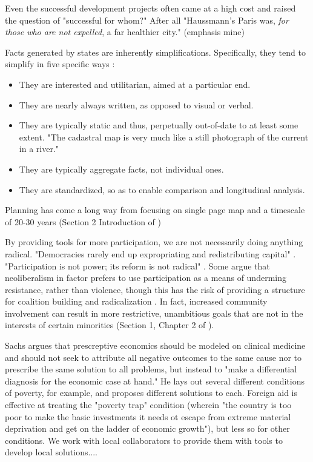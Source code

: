 Even the successful development projects often came at a high cost and raised the question of "successful for whom?" After all "Haussmann's Paris was, \textit{for those who are not expelled}, a far healthier city." (emphasis mine) \cite{scottSeeingStateHow2020}


Facts generated by states are inherently simplifications. Specifically, they tend to simplify in five specific ways \cite{scottSeeingStateHow2020}:

\begin{itemize} \setlength{\itemsep}{0pt} \setlength{\parskip}{0pt} 
	\item{They are interested and utilitarian, aimed at a particular end.}
	\item{They are nearly always written, as opposed to visual or verbal.}
	\item{They are typically static and thus, perpetually out-of-date to at least some extent. "The cadastral map is very much like a still photograph of the current in a river."}
	\item{They are typically aggregate facts, not individual ones.}
	\item{They are standardized, so as to enable comparison and longitudinal analysis.}
\end{itemize}


Planning has come a long way from focusing on single page map and a timescale of 20-30 years (Section 2 Introduction of \cite{robinsonDecisionmakingUrbanPlanning1972})

By providing tools for more participation, we are not necessarily doing anything radical. "Democracies rarely end up expropriating and redistributing capital" \cite{fainsteinSpatialJusticePlanning2016}. "Participation is not power; its reform is not radical" \cite{marcuseThreeHistoricCurrents2016}. Some argue that neoliberalism in factor prefers to use participation as a means of underming resistance, rather than violence, though this has the risk of providing a structure for coalition building and radicalization \cite{miraftabInsurgentPlanningSituating2016}. In fact, increased community involvement can result in more restrictive, unambitious goals that are not in the interests of certain minorities (Section 1, Chapter 2 of \cite{robinsonDecisionmakingUrbanPlanning1972}).


Sachs argues that prescreptive economics should be modeled on clinical medicine and should not seek to attribute all negative outcomes to the same cause nor to prescribe the same solution to all problems, but instead to "make a differential diagnosis for the economic case at hand." He lays out several different conditions of poverty, for example, and proposes different solutions to each. Foreign aid is effective at treating the "poverty trap" condition (wherein "the country is too poor to make the basic investments it needs ot escape from extreme material deprivation and get on the ladder of economic growth"), but less so for other conditions.  \cite{sachsAgeSustainableDevelopment2015} We work with local collaborators to provide them with tools to develop local solutions....


